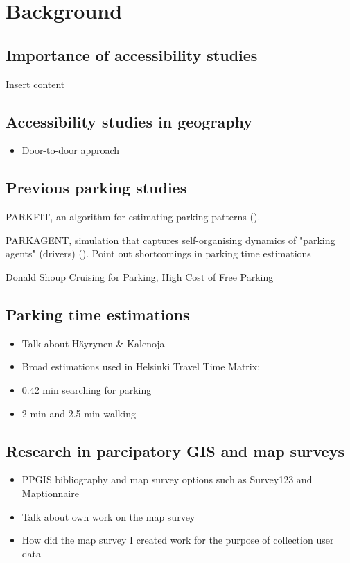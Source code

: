 \section{Background}
\subsection{Importance of accessibility studies}
\justify

Insert content

\newpage
\subsection{Accessibility studies in geography}
\justify

\begin{itemize}
  \item Door-to-door approach
\end{itemize}

\newpage
\subsection{Previous parking studies}
\justify

PARKFIT, an algorithm for estimating parking patterns (\cite{Levy2015}).

PARKAGENT, simulation that captures self-organising dynamics of "parking agents" (drivers) (\cite{Benenson2008}). Point out shortcomings in parking time estimations

Donald Shoup Cruising for Parking, High Cost of Free Parking

\newpage
\subsection{Parking time estimations}
\justify

\begin{itemize}
  \item Talk about Häyrynen \& Kalenoja
  \item Broad estimations used in Helsinki Travel Time Matrix:
  \item 0.42 min searching for parking
  \item 2 min and 2.5 min walking

\end{itemize}

\newpage
\subsection{Research in parcipatory GIS and map surveys}
\justify

\begin{itemize}
  \item PPGIS bibliography and map survey options such as Survey123 and Maptionnaire
  \item Talk about own work on the map survey
  \item How did the map survey I created work for the purpose of collection user data
\end{itemize}